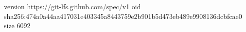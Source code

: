 version https://git-lfs.github.com/spec/v1
oid sha256:474a0a44aa417031e403345a8443759e2b901b5d473eb489e9908136dcbfcae0
size 6092
